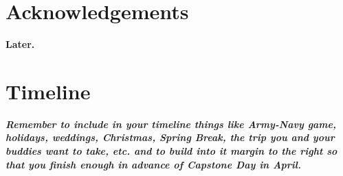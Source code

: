 \documentclass[onecolumn,10pt]{IEEEtran}
\newcommand{\myroot}{../}
\newcommand{\Later}{\textbf{Later.}}
\begin{document}
\section*{Acknowledgements}
\Later








\appendix
\section{Timeline}
\emph{\textbf{Remember to include in your timeline things like Army-Navy game, holidays, weddings, Christmas, Spring Break, the trip you and your buddies want to take, etc. and to build into it margin to the right so that you finish enough in advance of Capstone Day in April.}}
\end{document}
